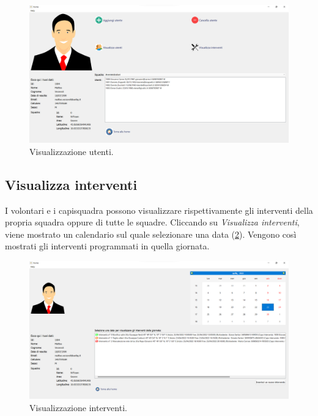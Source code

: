 \begin{figure}[h!]
	\centering
	\includegraphics[width=1\linewidth]{./ImageFiles/view_user}
	\caption{Visualizzazione utenti.}
	\label{fig:view_user}
\end{figure}

\subsection{Visualizza interventi}
I volontari e i capisquadra possono visualizzare rispettivamente gli interventi della propria squadra oppure di tutte le squadre. Cliccando su \textit{Visualizza interventi}, viene mostrato un calendario sul quale selezionare una data (\Fig\ref{fig:view_operation}). Vengono così mostrati gli interventi programmati in quella giornata.
\begin{figure}[h!]
	\centering
	\includegraphics[width=1\linewidth]{./ImageFiles/view_operation.png}
	\caption{Visualizzazione interventi.}
	\label{fig:view_operation}
\end{figure}

